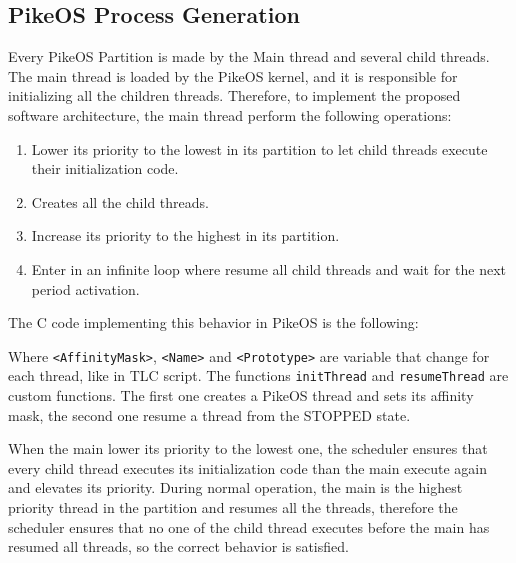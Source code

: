 \subsection{PikeOS Process Generation}\label{nativeprocess}
Every PikeOS Partition is made by the Main thread and several child threads. The main thread is loaded by the PikeOS kernel, and it is responsible for initializing all the children threads. Therefore, to implement the proposed software architecture, the main thread perform the following operations:
\begin{enumerate}
\item Lower its priority to the lowest in its partition to let child threads execute their initialization code.
\item Creates all the child threads.
\item Increase its priority to the highest in its partition.
\item Enter in an infinite loop where resume all child threads and wait for the next period activation.
\end{enumerate}
The C code implementing this behavior in PikeOS is the following:

Where \verb|<AffinityMask>|, \verb|<Name>| and \verb|<Prototype>| are variable that change for each thread, like in TLC script. The functions \verb|initThread| and \verb|resumeThread| are custom functions. The first one creates a PikeOS thread and sets its affinity mask, the second one resume a thread from the STOPPED state.
\par When the main lower its priority to the lowest one, the scheduler ensures that every child thread executes its initialization code than the main execute again and elevates its priority. During normal operation, the main is the highest priority thread in the partition and resumes all the threads, therefore the scheduler ensures that no one of the child thread executes before the main has resumed all threads, so the correct behavior is satisfied.

